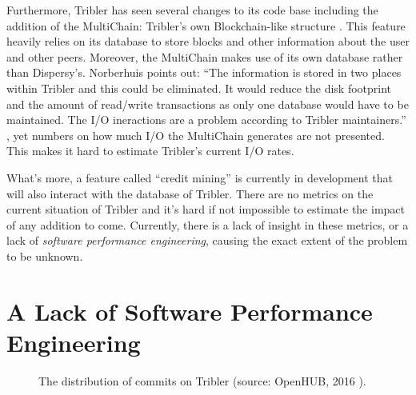Furthermore, Tribler has seen several changes to its code base including the addition of the MultiChain: Tribler's own Blockchain-like structure \cite{norberhuis2015multichain}.
This feature heavily relies on its database to store blocks and other information about the user and other peers.
Moreover, the MultiChain makes use of its own database rather than Dispersy's.
Norberhuis points out: \enquote{The information is stored in two places within Tribler and this could be eliminated. It would reduce the disk footprint and the amount of read/write transactions as only one database would have to be maintained. The I/O ineractions are a problem according to Tribler maintainers.} \cite{norberhuis2015multichain}, yet numbers on how much I/O the MultiChain generates are not presented.
This makes it hard to estimate Tribler's current I/O rates.

What's more, a feature called \enquote{credit mining} is currently in development that will also interact with the database of Tribler.
There are no metrics on the current situation of Tribler and it's hard if not impossible to estimate the impact of any addition to come.
Currently, there is a lack of insight in these metrics, or a lack of \emph{software performance engineering}, causing the exact extent of the problem to be unknown.


\section{A Lack of Software Performance Engineering}

\begin{figure}[!h]
	\caption{The distribution of commits on Tribler (source: OpenHUB, 2016 \cite{openhub2016tribler}).}
	\label{fig:commits_openhub}
\end{figure}

